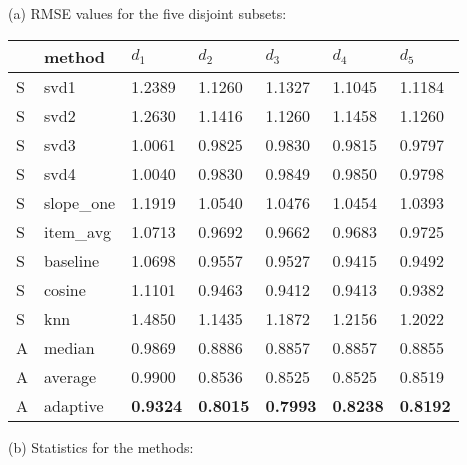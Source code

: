 \begin{table}
  
  \centering
  \tiny
  (a) RMSE values for the five disjoint subsets:

  \vspace{0.4em}

  \begin{tabular*}{0.9\textwidth}{ l l l l l l l }
    \hline
    { } & method & $d_1$ & $d_2$ & $d_3$ & $d_4$ & $d_5$ \\ 
    \hline
    S & svd1          & 1.2389	  & 1.1260	  & 1.1327	  & 1.1045	  & 1.1184	 \\
    S & svd2          & 1.2630	  & 1.1416    & 1.1260	  & 1.1458	  & 1.1260	 \\
    S & svd3          & 1.0061	  & 0.9825	  & 0.9830	  & 0.9815	  & 0.9797	 \\
    S & svd4          & 1.0040	  & 0.9830	  & 0.9849	  & 0.9850	  & 0.9798	 \\
    S & slope\_one    & 1.1919	  & 1.0540	  & 1.0476	  & 1.0454	  & 1.0393   \\
    S & item\_avg     & 1.0713	  & 0.9692	  & 0.9662	  & 0.9683	  & 0.9725	 \\
    S & baseline       & 1.0698	  & 0.9557	  & 0.9527	  & 0.9415	  & 0.9492	 \\
    S & cosine   	    & 1.1101	  & 0.9463	  & 0.9412	  & 0.9413	  & 0.9382	 \\
    S & knn       	  & 1.4850	  & 1.1435	  & 1.1872    & 1.2156	  & 1.2022	 \\
    \hline                                                                    
    A & median    	  & 0.9869	  & 0.8886	  & 0.8857    & 0.8857	  & 0.8855	 \\
    A & average    	  & 0.9900	  & 0.8536	  & 0.8525	  & 0.8525	  & 0.8519	 \\
    A & adaptive       & \textbf{0.9324}	  & \textbf{0.8015}	  & \textbf{0.7993}  & \textbf{0.8238} & \textbf{0.8192} \\
    \hline
  \end{tabular*}

  \vspace{2em}
  
  (b) Statistics for the methods:

  \vspace{0.4em}


\end{table}
